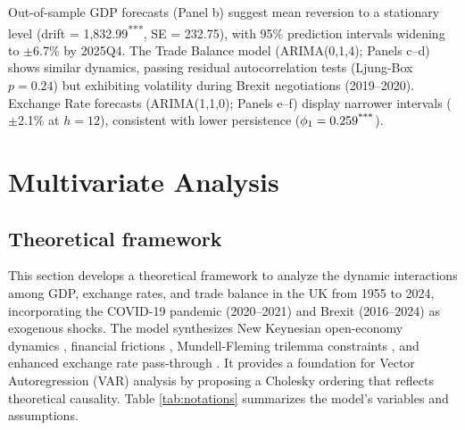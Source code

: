 \documentclass[
]{article}
\begin{document}
Out-of-sample GDP forecasts (Panel b) suggest mean reversion to a stationary 
level (drift = 1,832.99\textsuperscript{***}, SE = 232.75), with 95\% prediction 
intervals widening to $\pm$6.7\% by 2025Q4. The Trade Balance model
(ARIMA(0,1,4); Panels c--d) shows similar dynamics, passing residual 
autocorrelation tests (Ljung-Box $p = 0.24$) but exhibiting volatility
during Brexit negotiations (2019--2020). Exchange Rate forecasts (ARIMA(1,1,0); 
Panels e--f) display narrower intervals ($\pm$2.1\% at $h=12$), consistent with 
lower persistence ($\phi_1 = 0.259\textsuperscript{***}$). 

\section{Multivariate Analysis}

\subsection{Theoretical framework}

This section develops a theoretical framework to analyze the dynamic interactions 
among GDP, exchange rates, and trade balance in the UK from 1955 to 2024, incorporating 
the COVID-19 pandemic (2020--2021) and Brexit (2016--2024) as exogenous shocks. 
The model synthesizes New Keynesian open-economy dynamics %
, financial frictions
, Mundell-Fleming trilemma constraints %
, 
and enhanced exchange rate pass-through %
. It provides a foundation for 
Vector Autoregression (VAR) analysis by proposing a Cholesky ordering that reflects theoretical causality.
Table \ref{tab:notations} summarizes the model’s variables and assumptions.
\end{document}
